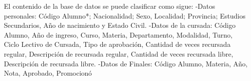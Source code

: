 
El contenido de la base de datos se puede clasificar como sigue:
-Datos personales:
Código Alumno*; Nacionalidad; Sexo, Localidad; Provincia;
Estudios Secundarios, Año de nacimiento y Estado Civil.
-Datos de la cursada:
Código Alumno, Año de ingreso, Curso, Materia, Departamento,
Modalidad, Turno, Ciclo Lectivo de Cursada, Tipo de aprobación,
Cantidad de veces recursada regular, Descripción de recursada
regular, Cantidad de veces recursada libre, Descripción de
recursada libre.
-Datos de Finales:
Código Alumno, Materia, Año, Nota, Aprobado, Promocionó
